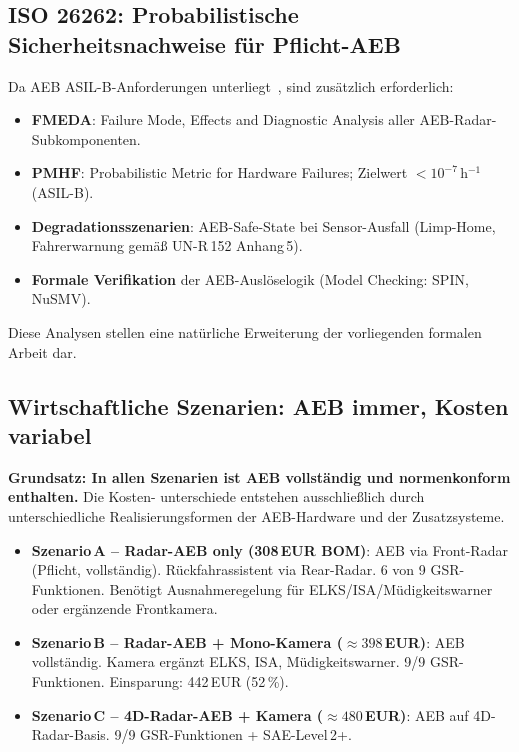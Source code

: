\documentclass[a4paper,12pt]{article}
\theoremstyle{definition}
\begin{document}
\subsection{ISO 26262: Probabilistische Sicherheitsnachweise f\"ur Pflicht-AEB}

Da AEB ASIL-B-Anforderungen unterliegt~\cite{iso26262}, sind
zus\"atzlich erforderlich:

\begin{itemize}
  \item \textbf{FMEDA}: Failure Mode, Effects and Diagnostic Analysis
        aller AEB-Radar-Subkompo\-nenten.
  \item \textbf{PMHF}: Probabilistic Metric for Hardware Failures;
        Zielwert $<10^{-7}$\,h$^{-1}$ (ASIL-B).
  \item \textbf{Degradationsszenarien}: AEB-Safe-State bei Sensor-Ausfall
        (Limp-Home, Fahrerwarnung gem\"a\ss{} UN-R\,152 Anhang\,5).
  \item \textbf{Formale Verifikation} der AEB-Ausl\"oselogik
        (Model Checking: SPIN, NuSMV).
\end{itemize}

Diese Analysen stellen eine nat\"urliche Erweiterung der vorliegenden
formalen Arbeit dar.

\subsection{Wirtschaftliche Szenarien: AEB immer, Kosten variabel}

\textcolor{accentred}{\textbf{Grundsatz: In allen Szenarien ist
AEB vollst\"andig und normenkonform enthalten.}} Die Kosten-
unterschiede entstehen ausschlie\ss{}lich durch unterschiedliche
Realisierungsformen der AEB-Hardware und der Zusatzsysteme.

\begin{itemize}
  \item \textbf{Szenario\,A -- Radar-AEB only (308\,EUR BOM)}:
        AEB via Front-Radar (Pflicht, vollst\"andig). R\"uckfahrassistent
        via Rear-Radar. 6 von 9 GSR-Funktionen. Ben\"otigt Ausnahmeregelung
        f\"ur ELKS/ISA/M\"udigkeitswarner oder erg\"anzende Frontkamera.
  \item \textbf{Szenario\,B -- Radar-AEB + Mono-Kamera ($\approx398$\,EUR)}:
        AEB vollst\"andig. Kamera erg\"anzt ELKS, ISA, M\"udigkeitswarner.
        9/9 GSR-Funktionen. Einsparung: 442\,EUR (52\,\%).
  \item \textbf{Szenario\,C -- 4D-Radar-AEB + Kamera ($\approx480$\,EUR)}:
        AEB auf 4D-Radar-Basis. 9/9 GSR-Funktionen + SAE-Level\,2+.
\end{itemize}
\end{document}
